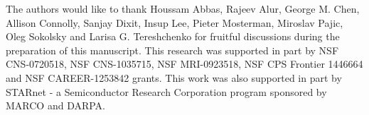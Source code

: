 \begin{acknowledgements}
The authors would like to thank Houssam Abbas, Rajeev Alur, George M. Chen, Allison Connolly, Sanjay Dixit, Insup Lee, Pieter Mosterman, Miroslav Pajic, Oleg Sokolsky and Larisa G. Tereshchenko for fruitful discussions during the preparation of this manuscript. This research was supported in part by NSF CNS-0720518, NSF CNS-1035715, NSF MRI-0923518, NSF CPS Frontier 1446664 and NSF CAREER-1253842 grants. This work was also supported in part by STARnet - a Semiconductor Research Corporation program sponsored by MARCO and DARPA.
\end{acknowledgements}
